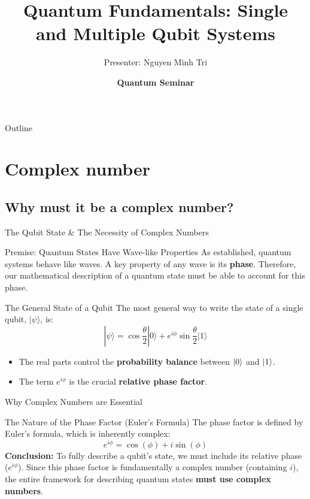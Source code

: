 \documentclass{beamer}
\title[\textbf{Single and Multiple qubits System}]
{\textbf{Quantum Fundamentals: Single and Multiple Qubit Systems}}
\author[Nguyen Minh Tri]
{Presenter: Nguyen Minh Tri}
\date[\displaydate{mydate}]{ 
\small \textcolor{myburgundy}{\textbf{Quantum Seminar} \\ \displaydate{mydate}}}
\begin{document}
\begin{frame}[plain]
  \titlepage
\end{frame}

\begin{frame}[allowframebreaks]{Outline}
    \tableofcontents
\end{frame}

\section{Complex number}
\subsection{Why must it be a complex number?}

\begin{frame}[fragile]{The Qubit State \& The Necessity of Complex Numbers}
    \begin{block}{Premise: Quantum States Have Wave-like Properties}
        As established, quantum systems behave like waves. A key property of any wave is its \textbf{phase}. Therefore, our mathematical description of a quantum state must be able to account for this phase.
    \end{block}
    
    \begin{block}{The General State of a Qubit}
        The most general way to write the state of a single qubit, $|\psi\rangle$, is:
        \[|\psi\rangle = \cos\frac{\theta}{2}|0\rangle + e^{i\phi}\sin\frac{\theta}{2}|1\rangle\]
        \begin{itemize}
            \item The real parts control the \textbf{probability balance} between $\ket{0}$ and $\ket{1}$.
            \item The term $e^{i\phi}$ is the crucial \textbf{relative phase factor}.
        \end{itemize}
    \end{block}
\end{frame}

\begin{frame}[fragile]{Why Complex Numbers are Essential}
    \begin{alertblock}{The Nature of the Phase Factor (Euler's Formula)}
        The phase factor is defined by Euler's formula, which is inherently complex:
        \[
        e^{i\phi} = \cos(\phi) + i\sin(\phi)
        \]
        \textbf{Conclusion:} To fully describe a qubit's state, we must include its relative phase ($e^{i\phi}$). Since this phase factor is fundamentally a complex number (containing $i$), the entire framework for describing quantum states \textbf{must use complex numbers}.
    \end{alertblock}
\end{frame}
\end{document}
